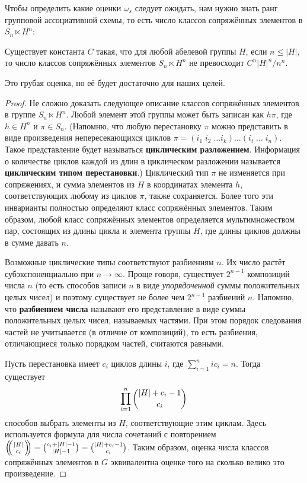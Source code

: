 Чтобы определить какие оценки $\omega_s$ следует ожидать, нам нужно знать ранг групповой ассоциативной схемы, то есть число классов сопряжённых элементов в $S_n \ltimes H^n$:
\begin{lemma}\label{lem:12:6.4}
  Существует константа $C$ такая, что для любой абелевой группы $H$, если $n \leq |H|$, то число классов сопряжённых элементов $S_n \ltimes H^n$ не превосходит $C^n |H|^n/ n^n$.
\end{lemma}
Это грубая оценка, но её будет достаточно для наших целей.
\begin{proof}
  Не сложно доказать следующее описание классов сопряжённых элементов в группе $S_n \ltimes H^n$. Любой элемент этой группы может быть записан как $h \pi$, где $h \in H^n$ и $\pi \in S_n$. (Напомню, что любую перестановку $\pi$ можно представить в виде произведения непересекающихся циклов $\pi = (i_1 \; i_2 \; \dotso i_k) \dotso (i_t \; \dotso \; i_n)$. Такое представление будет называться \textbf{циклическим разложением}. Информация о количестве циклов каждой из длин в циклическом разложении называется \textbf{циклическим типом перестановки}.) Циклический тип $\pi$ не изменяется при сопряжениях, и сумма элементов из $H$ в координатах элемента $h$, соответствующих любому из циклов $\pi$, также сохраняется. Более того эти инварианты полностью определяют класс сопряжённых элементов. Таким образом, любой класс сопряжённых элементов определяется мультимножеством пар, состоящих из длины цикла и элемента группы $H$, где длины циклов должны в сумме давать $n$.
  
  Возможные циклические типы соответствуют разбиениям $n$. Их число растёт субэкспоненциально при $n \to \infty$. Проще говоря, существует $2^{n-1}$ композиций числа $n$ (то есть способов записи $n$ в виде \textit{упорядоченной} суммы положительных целых чисел) и поэтому существует не более чем $2^{n-1}$ разбиений $n$. Напомню, что \textbf{разбиением числа} называют его представление в виде суммы положительных целых чисел, называемых частями. При этом порядок следования частей не учитывается (в отличие от композиций), то есть разбиения, отличающиеся только порядком частей, считаются равными.
  
  Пусть перестановка имеет $c_i$ циклов длины $i$, где $\sum_{i=1}^n i c_i = n$. Тогда существует
  \[
  	\prod_{i=1}^n \dbinom{|H| + c_i - 1}{c_i}
  \]
  способов выбрать элементы из $H$, соответствующие этим циклам. Здесь используется формула для числа сочетаний с повторением $\multiset{|H|}{c_i} = \binom{c_i + |H| - 1}{|H| - 1} = \binom{|H| + c_i - 1}{c_i}$. Таким образом, оценка числа классов сопряжённых элементов в $G$ эквивалентна оценке того на сколько велико это произведение.
  

\end{proof}
